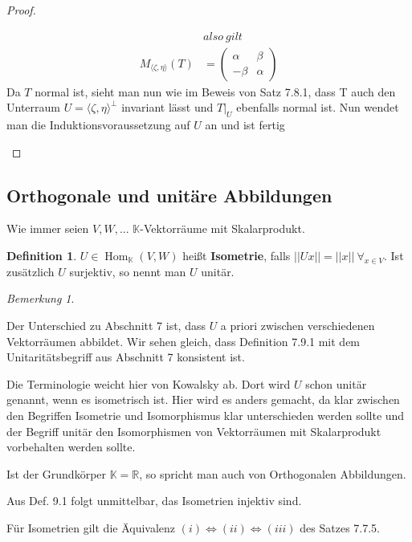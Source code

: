 \documentclass[12pt,a4paper]{article}
\theoremstyle{definition}
\newtheorem{definition}[theorem]{Definition}
\theoremstyle{remark}
\newtheorem*{remark}{Bemerkung}
\DeclareMathOperator{\Hom}{Hom}
\begin{document}
\begin{proof}
\begin{itemize}
\begin{equation}
\begin{split}
					&also \ gilt \\
					M_{\langle\zeta,\eta \rangle}(T) &= 
					\begin{pmatrix}
						\alpha & \beta \\
						-\beta & \alpha
					\end{pmatrix}
				\end{split}
			\end{equation}
			Da $T$ normal ist, sieht man nun wie im Beweis von Satz 7.8.1, dass T auch den Unterraum $U = \langle \zeta,\eta \rangle^{\perp}$ invariant lässt und $T|_U$ ebenfalls normal ist. Nun wendet man die Induktionsvoraussetzung auf $U$ an und ist fertig
		\end{itemize}
	\end{proof}
	\subsection{Orthogonale und unitäre Abbildungen}
	Wie immer seien $V,W,...$ $\mathbb{K}$-Vektorräume mit Skalarprodukt. \\
	\begin{definition}
		$U \in \Hom_{\mathbb{K}}(V,W)$ heißt \textbf{Isometrie}, falls $||Ux||=||x|| \ \forall_{x \in V}$.
		Ist zusätzlich $U$ surjektiv, so nennt man $U$ unitär.
	\end{definition}
	\begin{remark}
		\begin{proofenum}
			\item Der Unterschied zu Abschnitt 7 ist, dass $U$ a priori zwischen verschiedenen Vektorräumen abbildet. Wir sehen gleich, dass Definition 7.9.1 mit dem Unitaritätsbegriff aus Abschnitt 7 konsistent ist.
			\item Die Terminologie weicht hier von Kowalsky ab. Dort wird $U$ schon unitär genannt, wenn es isometrisch ist. Hier wird es anders gemacht, da klar zwischen den Begriffen Isometrie und Isomorphismus klar unterschieden werden sollte und der Begriff unitär  den Isomorphismen von Vektorräumen mit Skalarprodukt vorbehalten werden sollte.
			\item Ist der Grundkörper $ \mathbb{K}=\mathbb{R}$, so spricht man auch von Orthogonalen Abbildungen.
			\item Aus Def. 9.1 folgt unmittelbar, das Isometrien injektiv sind. 
			\item Für Isometrien gilt die Äquivalenz $(i) \Leftrightarrow (ii) \Leftrightarrow (iii)$ des Satzes 7.7.5.
		\end{proofenum}
	\end{remark}
\end{document}
